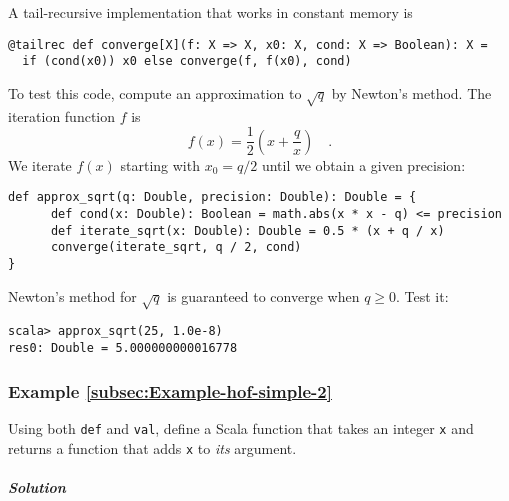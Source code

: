 A tail-recursive implementation that works in constant memory is 
\begin{lstlisting}
@tailrec def converge[X](f: X => X, x0: X, cond: X => Boolean): X =
  if (cond(x0)) x0 else converge(f, f(x0), cond)
\end{lstlisting}
To test this code, compute an approximation to $\sqrt{q}$ by Newton's
method. The iteration function $f$ is 
\[
f(x)=\frac{1}{2}\left(x+\frac{q}{x}\right)\quad.
\]
We iterate $f(x)$ starting with $x_{0}=q/2$ until we obtain a given
precision:
\begin{lstlisting}
def approx_sqrt(q: Double, precision: Double): Double = {
      def cond(x: Double): Boolean = math.abs(x * x - q) <= precision
      def iterate_sqrt(x: Double): Double = 0.5 * (x + q / x)
      converge(iterate_sqrt, q / 2, cond)
}
\end{lstlisting}
Newton's method for $\sqrt{q}$ is guaranteed to converge when $q\geq0$.
Test it:
\begin{lstlisting}
scala> approx_sqrt(25, 1.0e-8)
res0: Double = 5.000000000016778
\end{lstlisting}


\subsubsection{Example \label{subsec:Example-hof-simple-2}\ref{subsec:Example-hof-simple-2}}

Using both \lstinline!def! and \lstinline!val!, define a Scala function
that takes an integer \lstinline!x! and returns a function that adds
\lstinline!x! to \emph{its} argument.

\subparagraph{Solution}

